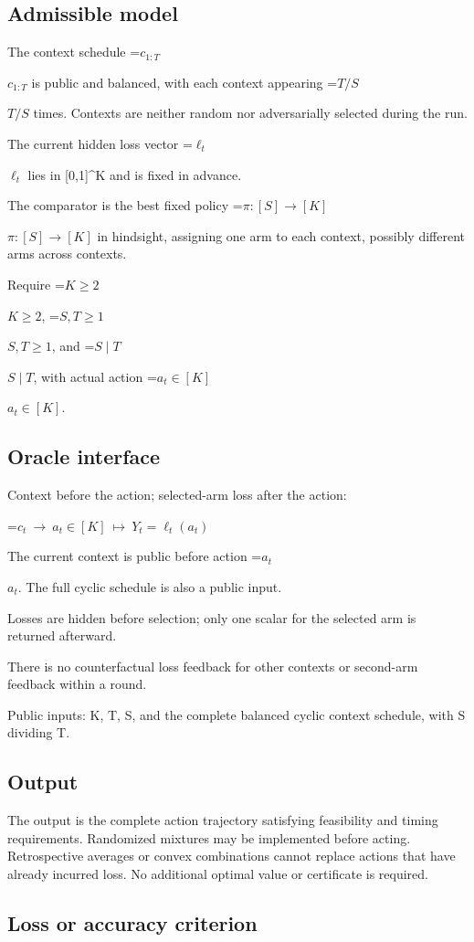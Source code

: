 \documentclass[10pt,a4paper]{article}
\newcommand{\AtlasMath}[1]{\par\begingroup\centering\setbox0=\hbox{$\displaystyle #1$}\ifdim\wd0>1.4\linewidth\typeout{ATLAS WIDE FORMULA: \the\wd0}\fi\ifdim\wd0>\linewidth\resizebox{\linewidth}{!}{\box0}\else\box0\fi\par\endgroup}
\newcommand{\AtlasInlineMath}[1]{\begingroup\setbox0=\hbox{$#1$}\ifdim\wd0>.4\linewidth\endgroup\AtlasMath{#1}\else\endgroup$#1$\fi}
\begin{document}
\subsection{Admissible model}
The context schedule \AtlasInlineMath{c_{1:T}} is public and balanced, with each context appearing \AtlasInlineMath{T/S} times. Contexts are neither random nor adversarially selected during the run.

The current hidden loss vector \AtlasInlineMath{\ell_t} lies in [0,1]\textasciicircum{}K and is fixed in advance.

The comparator is the best fixed policy \AtlasInlineMath{\pi:[S]\to[K]} in hindsight, assigning one arm to each context, possibly different arms across contexts.

Require \AtlasInlineMath{K\ge2}, \AtlasInlineMath{S,T\ge1}, and \AtlasInlineMath{S\mid T}, with actual action \AtlasInlineMath{a_t\in[K]}.

\subsection{Oracle interface}
Context before the action; selected-arm loss after the action:


\AtlasMath{c_t\ \longrightarrow\ a_t\in[K]\ \longmapsto\ Y_t=\ell_t(a_t)}


The current context is public before action \AtlasInlineMath{a_t}. The full cyclic schedule is also a public input.

Losses are hidden before selection; only one scalar for the selected arm is returned afterward.

There is no counterfactual loss feedback for other contexts or second-arm feedback within a round.

Public inputs: K, T, S, and the complete balanced cyclic context schedule, with S dividing T.

\subsection{Output}
The output is the complete action trajectory satisfying feasibility and timing requirements. Randomized mixtures may be implemented before acting. Retrospective averages or convex combinations cannot replace actions that have already incurred loss. No additional optimal value or certificate is required.

\subsection{Loss or accuracy criterion}
\end{document}
